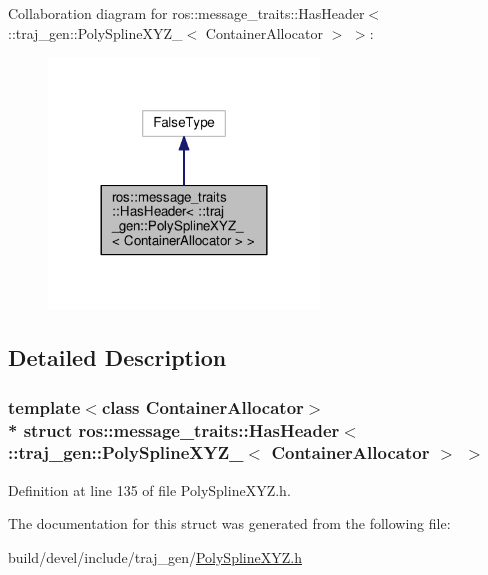 Collaboration diagram for ros\+:\+:message\+\_\+traits\+:\+:Has\+Header$<$ \+:\+:traj\+\_\+gen\+:\+:Poly\+Spline\+X\+Y\+Z\+\_\+$<$ Container\+Allocator $>$ $>$\+:
\nopagebreak
\begin{figure}[H]
\begin{center}
\leavevmode
\includegraphics[width=204pt]{structros_1_1message__traits_1_1_has_header_3_01_1_1traj__gen_1_1_poly_spline_x_y_z___3_01_conta06f90fe96c801fa2e95cc1695f45131e}
\end{center}
\end{figure}


\subsection{Detailed Description}
\subsubsection*{template$<$class Container\+Allocator$>$\\*
struct ros\+::message\+\_\+traits\+::\+Has\+Header$<$ \+::traj\+\_\+gen\+::\+Poly\+Spline\+X\+Y\+Z\+\_\+$<$ Container\+Allocator $>$ $>$}



Definition at line 135 of file Poly\+Spline\+X\+Y\+Z.\+h.



The documentation for this struct was generated from the following file\+:\begin{DoxyCompactItemize}
\item 
build/devel/include/traj\+\_\+gen/\hyperlink{_poly_spline_x_y_z_8h}{Poly\+Spline\+X\+Y\+Z.\+h}\end{DoxyCompactItemize}
